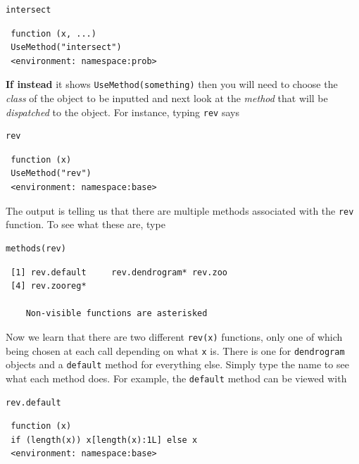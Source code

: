 \documentclass[captions=tableheading]{scrbook}
\begin{document}
\lstset{language=R}
\begin{lstlisting}
intersect
\end{lstlisting}

\begin{verbatim}
 function (x, ...) 
 UseMethod("intersect")
 <environment: namespace:prob>
\end{verbatim}

\textbf{If instead} it shows \texttt{UseMethod(something)} then you will need to choose the \emph{class} of the object to be inputted and next look at the \emph{method} that will be \emph{dispatched} to the object. For instance, typing \texttt{rev} says 


\lstset{language=R}
\begin{lstlisting}
rev
\end{lstlisting}

\begin{verbatim}
 function (x) 
 UseMethod("rev")
 <environment: namespace:base>
\end{verbatim}

The output is telling us that there are multiple methods associated with the \texttt{rev} function. To see what these are, type


\lstset{language=R}
\begin{lstlisting}
methods(rev)
\end{lstlisting}

\begin{verbatim}
 [1] rev.default     rev.dendrogram* rev.zoo        
 [4] rev.zooreg*    
 
    Non-visible functions are asterisked
\end{verbatim}

Now we learn that there are two different \texttt{rev(x)} functions, only one of which being chosen at each call depending on what \texttt{x} is. There is one for \texttt{dendrogram} objects and a \texttt{default} method for everything else. Simply type the name to see what each method does. For example, the \texttt{default} method can be viewed with


\lstset{language=R}
\begin{lstlisting}
rev.default
\end{lstlisting}

\begin{verbatim}
 function (x) 
 if (length(x)) x[length(x):1L] else x
 <environment: namespace:base>
\end{verbatim}
\end{document}
